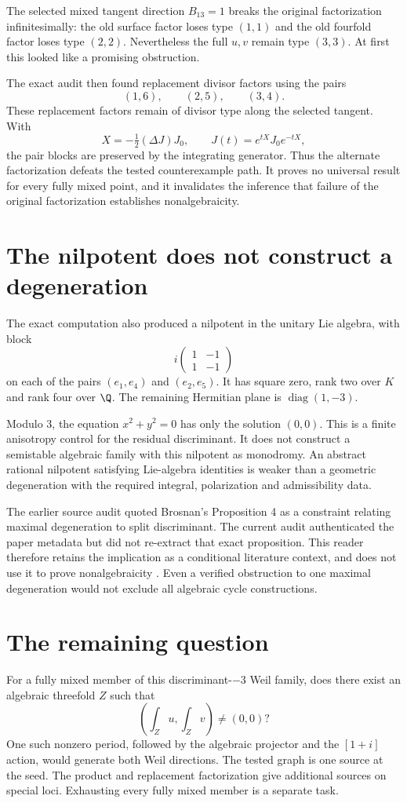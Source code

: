 The selected mixed tangent direction $B_{13}=1$ breaks the original factorization infinitesimally: the old surface factor loses type $(1,1)$ and the old fourfold factor loses type $(2,2)$. Nevertheless the full $u,v$ remain type $(3,3)$. At first this looked like a promising obstruction.

The exact audit then found replacement divisor factors using the pairs
\[
(1,6),\qquad(2,5),\qquad(3,4).
\]
These replacement factors remain of divisor type along the selected tangent. With
\[
X=-\tfrac12(\Delta J)J_0,\qquad
J(t)=e^{tX}J_0e^{-tX},
\]
the pair blocks are preserved by the integrating generator. Thus the alternate factorization defeats the tested counterexample path. It proves no universal result for every fully mixed point, and it invalidates the inference that failure of the original factorization establishes nonalgebraicity.

\section{The nilpotent does not construct a degeneration}
The exact computation also produced a nilpotent in the unitary Lie algebra, with block
\[
i\begin{pmatrix}1&-1\\1&-1\end{pmatrix}
\]
on each of the pairs $(e_1,e_4)$ and $(e_2,e_5)$. It has square zero, rank two over $K$ and rank four over $\Q$. The remaining Hermitian plane is $\operatorname{diag}(1,-3)$.

Modulo 3, the equation $x^2+y^2=0$ has only the solution $(0,0)$. This is a finite anisotropy control for the residual discriminant. It does not construct a semistable algebraic family with this nilpotent as monodromy. An abstract rational nilpotent satisfying Lie-algebra identities is weaker than a geometric degeneration with the required integral, polarization and admissibility data.

The earlier source audit quoted Brosnan's Proposition 4 as a constraint relating maximal degeneration to split discriminant. The current audit authenticated the paper metadata but did not re-extract that exact proposition. This reader therefore retains the implication as a conditional literature context, and does not use it to prove nonalgebraicity \cite{BrosnanDegeneration}. Even a verified obstruction to one maximal degeneration would not exclude all algebraic cycle constructions.

\section{The remaining question}
For a fully mixed member of this discriminant-$-3$ Weil family, does there exist an algebraic threefold $Z$ such that
\[
\left(\int_Zu,\int_Zv\right)\ne(0,0)?
\]
One such nonzero period, followed by the algebraic projector and the $[1+i]$ action, would generate both Weil directions. The tested graph is one source at the seed. The product and replacement factorization give additional sources on special loci. Exhausting every fully mixed member is a separate task.

